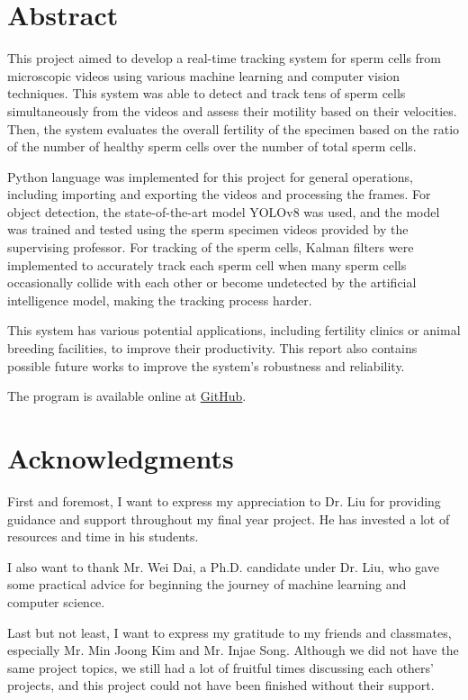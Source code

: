 \documentclass[12pt]{report}
\begin{document}


\chapter*{Abstract}
This project aimed to develop a real-time tracking system for sperm cells from microscopic videos using various machine learning and computer vision techniques. This system was able to detect and track tens of sperm cells simultaneously from the videos and assess their motility based on their velocities. Then, the system evaluates the overall fertility of the specimen based on the ratio of the number of healthy sperm cells over the number of total sperm cells.

Python language was implemented for this project for general operations, including importing and exporting the videos and processing the frames. For object detection, the state-of-the-art model YOLOv8 was used, and the model was trained and tested using the sperm specimen videos provided by the supervising professor. For tracking of the sperm cells, Kalman filters were implemented to accurately track each sperm cell when many sperm cells occasionally collide with each other or become undetected by the artificial intelligence model, making the tracking process harder.

This system has various potential applications, including fertility clinics or animal breeding facilities, to improve their productivity. This report also contains possible future works to improve the system's robustness and reliability.

The program is available online at \href{https://github.com/rladntjr7/FYP}{\underline{GitHub}}.


\chapter*{Acknowledgments}
First and foremost, I want to express my appreciation to Dr. Liu for providing guidance and support throughout my final year project. He has invested a lot of resources and time in his students. 

I also want to thank Mr. Wei Dai, a Ph.D. candidate under Dr. Liu, who gave some practical advice for beginning the journey of machine learning and computer science. 

Last but not least, I want to express my gratitude to my friends and classmates, especially Mr. Min Joong Kim and Mr. Injae Song. Although we did not have the same project topics, we still had a lot of fruitful times discussing each others' projects, and this project could not have been finished without their support.

\tableofcontents
\listoffigures
\listoftables







\appendix



\end{document}
